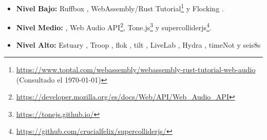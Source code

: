 \begin{itemize}

\item \textbf{Nivel Bajo:} Ruffbox \citep{ruffbox}, WebAssembly/Rust Tutorial\footnote{\url{https://www.toptal.com/webassembly/webassembly-rust-tutorial-web-audio} (Consultado el \today)} y Flocking \citep{flocking}.
\item \textbf{Nivel Medio:} \citep{supercolliderweb}, Web Audio API\footnote{\url{https://developer.mozilla.org/es/docs/Web/API/Web_Audio_API}}, Tone.js\footnote{\url{https://tonejs.github.io/}} y supercolliderjs\footnote{\url{https://github.com/crucialfelix/supercolliderjs/}}.
\item \textbf{Nivel Alto:} Estuary \citep{estuary}, Troop \citep{Troop}, flok \citep{flok}, tilt \citep{tilt}, LiveLab \citep{livelab}, Hydra \citep{hydra}, timeNot \citep{timenot} y seis8s \citep{seis8s}
  
\end{itemize}

